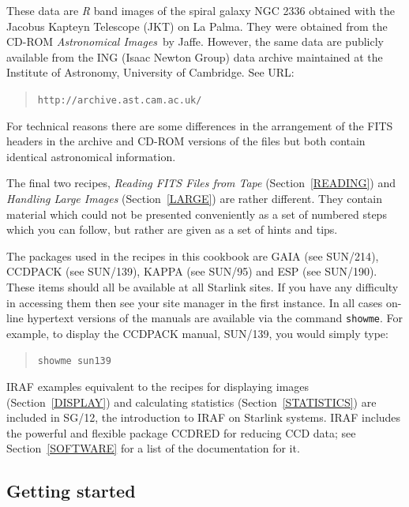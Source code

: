 \documentclass[twoside,11pt]{article}
\newcommand{\htmladdnormallink}[2]{#1}
\newcommand{\xref}[3]{#1}
\begin{document}
These data are {\it R}\/ band images of the spiral galaxy NGC 2336
obtained with the Jacobus Kapteyn Telescope (JKT) on La Palma.  They were
obtained from the CD-ROM {\it Astronomical Images}\, by
Jaffe\cite{JAFFE98}.  However, the same data are publicly available from
the ING (Isaac Newton Group) data archive maintained at the
\htmladdnormallink{Institute of Astronomy}{http://www.ast.cam.ac.uk/},
\htmladdnormallink{University of Cambridge}{http://www.cam.ac.uk/}.
See URL:

\begin{quote}
\htmladdnormallink{ {\tt http://archive.ast.cam.ac.uk/}}
{http://archive.ast.cam.ac.uk/}
\end{quote}

For technical reasons there are some differences in the arrangement of the
FITS headers in the archive and CD-ROM versions of the files but both
contain identical astronomical information.

The final two recipes, {\it Reading FITS Files from Tape}\/
(Section~\ref{READING}) and {\it Handling Large Images}\/
(Section~\ref{LARGE}) are rather different.  They contain material
which could not be presented conveniently as a set of numbered steps
which you can follow, but rather are given as a set of hints and tips.

The packages used in the recipes in this cookbook are
GAIA (see \xref{SUN/214}{sun214}{}\/\cite{SUN214}),
CCDPACK (see \xref{SUN/139}{sun139}{}\/\cite{SUN139}),
KAPPA (see \xref{SUN/95}{sun95}{}\/\cite{SUN95}) and
ESP (see \xref{SUN/190}{sun180}{}\/\cite{SUN180}).
These items should all be available at all Starlink sites.  If you have
any difficulty in accessing them then see your site manager in the first
instance.  In all cases on-line hypertext versions of the manuals are
available via the command {\tt showme}.  For example, to display the
CCDPACK manual, SUN/139, you would simply type:

\begin{quote}
{\tt showme sun139}
\end{quote}

IRAF examples equivalent to the recipes for displaying images
(Section~\ref{DISPLAY}) and calculating statistics (Section~\ref{STATISTICS})
are included in \xref{SG/12}{sg12}{}\/\cite{SG12}, the introduction to
IRAF on Starlink systems.  IRAF includes the powerful and flexible package
CCDRED for reducing CCD data; see Section~\ref{SOFTWARE} for a list of the
documentation for it.

\subsection{\label{START}Getting started}
\end{document}
